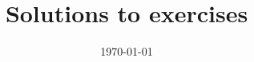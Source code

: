 \documentclass[12pt,a4paper]{amsart}
\title[Solutions to exercises]{Solutions to exercises}
\date{\today}
\theoremstyle{plain}
\theoremstyle{definition}
\theoremstyle{remark}
\begin{document}
\maketitle



\vfill
\end{document}
